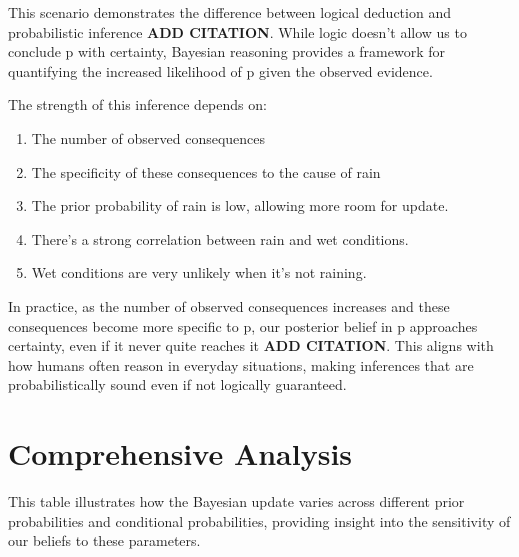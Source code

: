 \documentclass[10pt,a4paper]{article}
\begin{document}
This scenario demonstrates the difference between logical deduction and probabilistic inference \textbf{ADD CITATION}. While logic doesn't allow us to conclude p with certainty, Bayesian reasoning provides a framework for quantifying the increased likelihood of p given the observed evidence.

The strength of this inference depends on:

\begin{enumerate}
    \item The number of observed consequences
    \item The specificity of these consequences to the cause of rain
    \item The prior probability of rain is low, allowing more room for update.
    \item There's a strong correlation between rain and wet conditions.
    \item Wet conditions are very unlikely when it's not raining.
\end{enumerate}

In practice, as the number of observed consequences increases and these consequences become more specific to p, our posterior belief in p approaches certainty, even if it never quite reaches it \textbf{ADD CITATION}. This aligns with how humans often reason in everyday situations, making inferences that are probabilistically sound even if not logically guaranteed.

\section{Comprehensive Analysis}


This table illustrates how the Bayesian update varies across different prior probabilities and conditional probabilities, providing insight into the sensitivity of our beliefs to these parameters.
\end{document}
